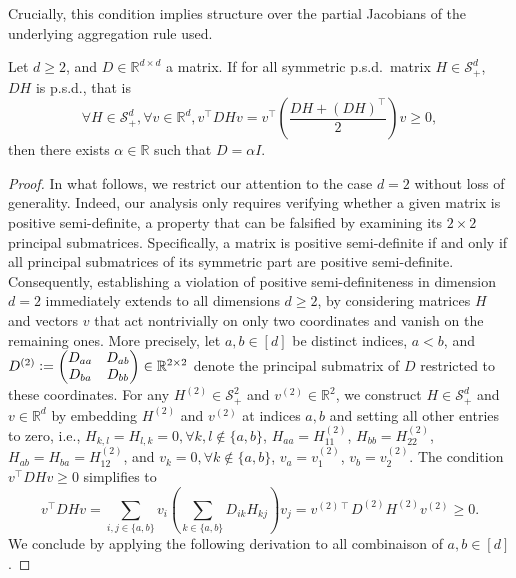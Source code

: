 \documentclass[twoside,11pt]{article}
\newcommand\mc{\mathcal}
\newcommand{\R}{\mathbb{R}}
\begin{document}
Crucially, this condition implies structure over the partial Jacobians of the underlying aggregation rule used. 
\begin{lemma}\label{lem:psd-crux}
  Let $d \geq 2$, and $D \in \R^{d \times d}$ a matrix. 
  If for all symmetric p.s.d.\ matrix $H \in \mc{S}^d_+$, $DH$ is p.s.d., that is
  \begin{equation*}
    \forall H \in \mc{S}^d_+, \forall v \in \R^d, v^\intercal DH v = v^\intercal \left(\frac{DH + (DH)^\intercal}{2}\right) v \geq 0,
  \end{equation*}
  then there exists $\alpha \in \R$ such that $D = \alpha I$.
\end{lemma}
\begin{proof}
  In what follows, we restrict our attention to the case $d=2$ without loss of generality. 
  Indeed, our analysis only requires verifying whether a given matrix is positive semi-definite, a property that can be falsified by examining its $2\times2$ principal submatrices. 
  Specifically, a matrix is positive semi-definite if and only if all principal submatrices of its symmetric part are positive semi-definite. 
  Consequently, establishing a violation of positive semi-definiteness in dimension $d=2$ immediately extends to all dimensions $d \geq 2$, by considering matrices $H$ and vectors $v$ that act nontrivially on only two coordinates and vanish on the remaining ones.
  More precisely, let $a, b \in [d]$ be distinct indices, $a < b$, and $D^{(2)} \vcentcolon= \begin{pmatrix} D_{aa} & D_{ab} \\ D_{ba} & D_{bb} \end{pmatrix} \in \R^{2 \times 2}$ denote the principal submatrix of $D$ restricted to these coordinates. 
  For any $H^{(2)} \in \mc{S}^2_+$ and $v^{(2)} \in \R^2$, we construct $H \in \mc{S}^d_+$ and $v \in \R^d$ by embedding $H^{(2)}$ and $v^{(2)}$ at indices $a, b$ and setting all other entries to zero, i.e., $H_{k,l} = H_{l,k} = 0, \forall k, l \notin \{ a, b \}$, $H_{aa} = H^{(2)}_{11}$, $H_{bb} = H^{(2)}_{22}$, $H_{ab} = H_{ba} = H^{(2)}_{12}$, and $v_k = 0, \forall k \notin \{ a, b \}$, $v_a = v^{(2)}_1$, $v_b = v^{(2)}_2$.
  The condition $v^\intercal D H v \geq 0$ simplifies to
  \[
    v^\intercal D H v 
    = \sum_{i,j \in \{ a, b \}} v_i \left( \sum_{k \in \{ a, b \}} D_{ik} H_{kj} \right) v_j 
    = v^{(2)\intercal} D^{(2)} H^{(2)} v^{(2)} \geq 0.
  \]
  We conclude by applying the following derivation to all combinaison of $a, b \in [d]$.


\end{proof}
\end{document}
